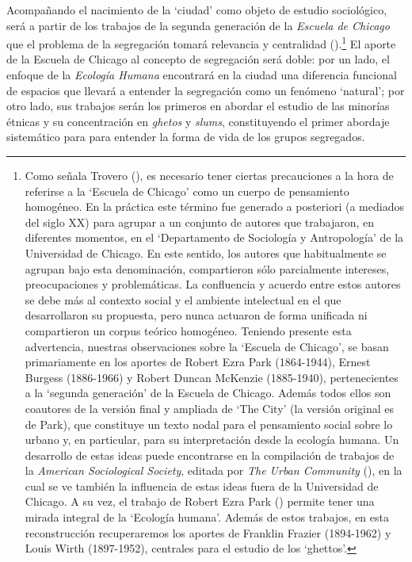 \documentclass[
  spanish,
  a4paper,%
  chapterprefix=true,%
  DIV=calc,%
  twoside]{scrbook}%
\begin{document}
Acompañando el nacimiento de la `ciudad' como objeto de estudio
sociológico, será a partir de los trabajos de la segunda generación de
la \emph{Escuela de Chicago} que el problema de la segregación tomará
relevancia y centralidad ().\footnote{Como señala Trovero (), es necesario tener ciertas
  precauciones a la hora de referirse a la `Escuela de Chicago' como
  un cuerpo de pensamiento homogéneo. En la práctica este término fue
  generado a posteriori (a mediados del siglo XX) para agrupar a un
  conjunto de autores que trabajaron, en diferentes momentos, en el
  `Departamento de Sociología y Antropología' de la Universidad de
  Chicago. En este sentido, los autores que habitualmente se agrupan
  bajo esta denominación, compartieron sólo parcialmente intereses,
  preocupaciones y problemáticas. La confluencia y acuerdo entre estos
  autores se debe más al contexto social y el ambiente intelectual en
  el que desarrollaron su propuesta, pero nunca actuaron de forma
  unificada ni compartieron un corpus teórico homogéneo. Teniendo
  presente esta advertencia, nuestras observaciones sobre la `Escuela
  de Chicago', se basan primariamente en los aportes de Robert Ezra
  Park (1864-1944), Ernest Burgess (1886-1966) y Robert Duncan
  McKenzie (1885-1940), pertenecientes a la `segunda generación' de la
  Escuela de Chicago. Además todos ellos son coautores de la versión
  final y ampliada de `The City' (la versión original es de Park), que
  constituye un texto nodal para el pensamiento social sobre lo urbano
  y, en particular, para su interpretación desde la ecología humana.
  Un desarrollo de estas ideas puede encontrarse en la compilación de
  trabajos de la \emph{American Sociological Society}, editada por
  \emph{The Urban Community} (), en la cual se ve también la influencia de estas ideas
  fuera de la Universidad de Chicago. A su vez, el trabajo de
  Robert Ezra Park () permite tener una mirada integral de la `Ecología humana'.
  Además de estos trabajos, en esta reconstrucción recuperaremos los
  aportes de Franklin Frazier (1894-1962) y Louis Wirth (1897-1952),
  centrales para el estudio de los `ghettos'.} El
aporte de la Escuela de Chicago al concepto de segregación será doble:
por un lado, el enfoque de la \emph{Ecología Humana} encontrará en la ciudad
una diferencia funcional de espacios que llevará a entender la
segregación como un fenómeno `natural'; por otro lado, sus trabajos
serán los primeros en abordar el estudio de las minorías étnicas y su
concentración en \emph{ghetos} y \emph{slums}, constituyendo el primer abordaje
sistemático para para entender la forma de vida de los grupos
segregados.
\end{document}

